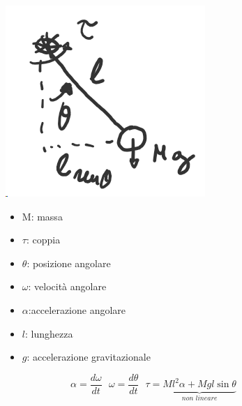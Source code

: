 	\begin{figure}[H]
		\begin{minipage}{.3\textwidth}
			\includegraphics[width=.6\linewidth]{"Images/pendolosemplice.png"}
		\end{minipage}%
		\begin{minipage}{.3\textwidth}
			\begin{itemize}
				\item M: massa
				\item $ \tau $: coppia
				\item $ \theta $: posizione angolare
				\item $ \omega $: velocità angolare
				\item $ \alpha $:accelerazione angolare
				\item $ l $: lunghezza
				\item $ g $: accelerazione gravitazionale
			\end{itemize}
		\end{minipage}
		\begin{minipage}{.3\textwidth}
			\centering
			\begin{equation*}
				\boxed{\alpha = \frac{d\omega}{dt}}\text{ }
				\boxed{\omega = \frac{d\theta}{dt}}\text{  }
				\tau = \underbrace{Ml^2\alpha + Mgl\sin\theta}_{\textit{non lineare}}
			\end{equation*}
		\end{minipage}
	\end{figure}
	
